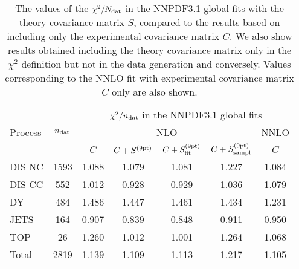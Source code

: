 \begin{table}[t]
\begin{center}
\renewcommand*{\arraystretch}{1.78}
\footnotesize
\begin{tabular}{|l|c|c|c|cc|c|}
  \toprule
  &    & \multicolumn{5}{c|}{$\chi^2/n_{\rm dat}$ in the NNPDF3.1 global fits}   \\
 Process & $n_{\rm dat}$ & \multicolumn{4}{c|}{NLO}  & NNLO  \\
 &  & $C$ & $C+S^{(\rm 9pt)}$   &   $C+S^{(\rm 9pt)}_{\rm fit}$ &
  $C+S^{(\rm 9pt)}_{\rm sampl}$   &  $C$ \\
\toprule
DIS NC    & 1593 & 1.088  & 1.079   &  1.081 & 1.227 & 1.084 \\
DIS CC    & 552  & 1.012  & 0.928   &  0.929 & 1.036 & 1.079 \\
\midrule  
DY        & 484  & 1.486  & 1.447   &  1.461 & 1.434 & 1.231 \\
JETS      & 164  & 0.907  & 0.839   &  0.848 & 0.911 & 0.950 \\
TOP       & 26   & 1.260  & 1.012   &  1.001 & 1.264 & 1.068 \\
\midrule
Total     & 2819 & 1.139  & 1.109   &  1.113 & 1.217 & 1.105 \\
\bottomrule
\end{tabular}
\end{center}
\caption{The values of the $\chi^2/N_{\rm dat}$ 
  in the NNPDF3.1 global fits with the theory covariance matrix $S$, compared to the results based on including only
  the experimental covariance matrix $C$. We also show  results obtained
  including the theory covariance matrix only in the $\chi^2$ definition but not
  in the data generation and conversely.
  Values corresponding to the NNLO fit with  experimental covariance matrix $C$ only are also shown.
  \label{table:chi2table_covth_global_nlo}
}
  \end{table}

